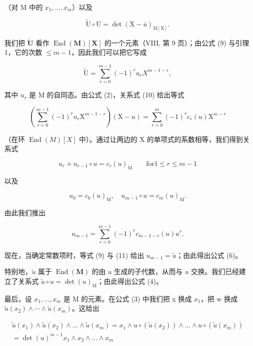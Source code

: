 （对 M 中的 \(x_{1},\ldots ,x_{m}\)）以及

\[
\widetilde {\mathrm{U}} \circ \mathrm{U} = \det (\mathrm{X} - \overline {{u}}) _ {\mathrm{M} [ \mathrm{X} ]}.\tag{10}
\]

我们把 \(\widetilde{\mathbf{U}}\) 看作 \(\operatorname{End}(\mathbf{M})[\mathbf{X}]\) 的一个元素（VIII, 第 9 页）；由公式 (9) 与引理 1，它的次数 \(\leqslant m - 1\)，因此我们可以把它写成

\[
\widetilde {\mathrm{U}} = \sum_ {r = 0} ^ {m - 1} (- 1) ^ {r} u _ {r} X ^ {m - 1 - r},\tag{11}
\]

其中 \(u_{r}\) 是 M 的自同态。由公式 (2)，关系式 (10) 给出等式

\[
\left(\sum_ {r = 0} ^ {m - 1} (- 1) ^ {r} u _ {r} \mathrm{X} ^ {m - 1 - r}\right) (\mathrm{X} - u) = \sum_ {r = 0} ^ {m} (- 1) ^ {r} c _ {r} (u) \mathrm{X} ^ {m - r}\tag{12}
\]

（在环 \(\operatorname{End}(M)[X]\) 中）。通过让两边的 X 的单项式的系数相等，我们得到关系式

\[
u _ {r} + u _ {r - 1} \circ u = c _ {r} (u) _ {\mathrm{M}} \qquad \mathrm{for} 1 \leqslant r \leqslant m - 1\tag{13}
\]

以及

\[
u _ {0} = c _ {0} (u) _ {\mathrm{M}}, \quad u _ {m - 1} \circ u = c _ {m} (u) _ {\mathrm{M}}.\tag{14}
\]

由此我们推出

\[
u _ {m - 1} = \sum_ {r = 0} ^ {m - 1} (- 1) ^ {r} c _ {m - 1 - r} (u) u ^ {r}.\tag{15}
\]

现在，当确定常数项时，等式 (9) 与 (11) 给出 \(u_{m-1} = \widetilde{u}\)；由此得出公式 (6)。

特别地，\(\widetilde{u}\) 属于 \(\operatorname{End}(\mathbf{M})\) 的由 \(u\) 生成的子代数，从而与 \(u\) 交换。我们已经建立了关系式 \(\widetilde{u} \circ u = \det(u)_{\mathrm{M}}\)；由此得出公式 (4)。

最后，设 \(x_{1},\ldots,x_{m}\) 是 M 的元素。在公式 (3) 中我们把 x 换成 \(x_{1}\)，把 w 换成 \(\widetilde{u}(x_{2})\wedge\cdots\wedge\widetilde{u}(x_{m})\)。这给出

\[
\begin{array}{c} \widetilde {u} (x _ {1}) \wedge \widetilde {u} (x _ {2}) \wedge \dots \wedge \widetilde {u} (x _ {m}) = x _ {1} \wedge u \circ (\widetilde {u} (x _ {2})) \wedge \dots \wedge u \circ (\widetilde {u} (x _ {m})) \\ = \det (u) ^ {m - 1} x _ {1} \wedge x _ {2} \wedge \dots \wedge x _ {m} \end{array}
\]

